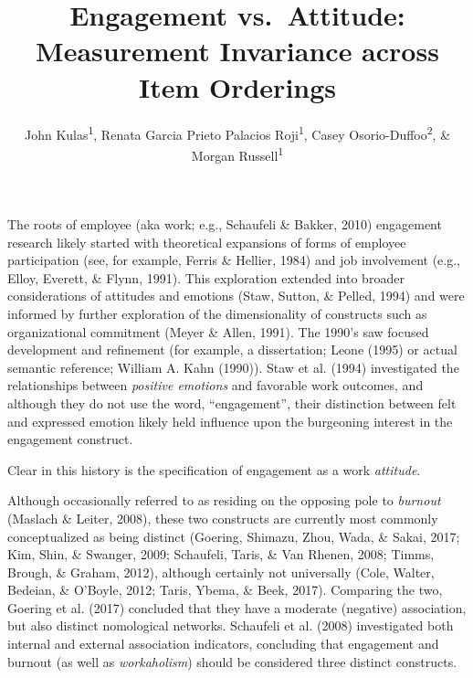 \documentclass[
  english,
  man]{apa6}
\title{Engagement vs.~Attitude: Measurement Invariance across Item Orderings}
\author{John Kulas\textsuperscript{1}, Renata Garcia Prieto Palacios Roji\textsuperscript{1}, Casey Osorio-Duffoo\textsuperscript{2}, \& Morgan Russell\textsuperscript{1}}
\date{}
\affiliation{\vspace{0.5cm}\textsuperscript{1} Montclair State University\\\textsuperscript{2} Harver}
\begin{document}
\maketitle

The roots of employee (aka work; e.g., Schaufeli \& Bakker, 2010) engagement research likely started with theoretical expansions of forms of employee participation (see, for example, Ferris \& Hellier, 1984) and job involvement (e.g., Elloy, Everett, \& Flynn, 1991). This exploration extended into broader considerations of attitudes and emotions (Staw, Sutton, \& Pelled, 1994) and were informed by further exploration of the dimensionality of constructs such as organizational commitment (Meyer \& Allen, 1991). The 1990's saw focused development and refinement (for example, a dissertation; Leone (1995) or actual semantic reference; William A. Kahn (1990)). Staw et al. (1994) investigated the relationships between \emph{positive emotions} and favorable work outcomes, and although they do not use the word, \enquote{engagement}, their distinction between felt and expressed emotion likely held influence upon the burgeoning interest in the engagement construct.

Clear in this history is the specification of engagement as a work \emph{attitude}.

Although occasionally referred to as residing on the opposing pole to \emph{burnout} (Maslach \& Leiter, 2008), these two constructs are currently most commonly conceptualized as being distinct (Goering, Shimazu, Zhou, Wada, \& Sakai, 2017; Kim, Shin, \& Swanger, 2009; Schaufeli, Taris, \& Van Rhenen, 2008; Timms, Brough, \& Graham, 2012), although certainly not universally (Cole, Walter, Bedeian, \& O'Boyle, 2012; Taris, Ybema, \& Beek, 2017). Comparing the two, Goering et al. (2017) concluded that they have a moderate (negative) association, but also distinct nomological networks. Schaufeli et al. (2008) investigated both internal and external association indicators, concluding that engagement and burnout (as well as \emph{workaholism}) should be considered three distinct constructs.
\end{document}
